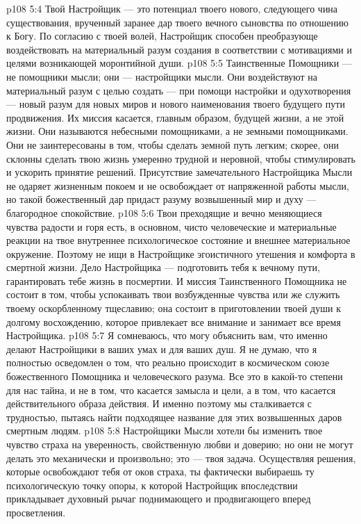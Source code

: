 \vs p108 5:4 \pc Твой Настройщик --- это потенциал твоего нового, следующего чина существования, врученный заранее дар твоего вечного сыновства по отношению к Богу. По согласию с твоей волей, Настройщик способен преобразующе воздействовать на материальный разум создания в соответствии с мотивациями и целями возникающей моронтийной души.
\vs p108 5:5 Таинственные Помощники --- не помощники мысли; они --- настройщики мысли. Они воздействуют на материальный разум с целью создать --- при помощи настройки и одухотворения --- новый разум для новых миров и нового наименования твоего будущего пути продвижения. Их миссия касается, главным образом, будущей жизни, а не этой жизни. Они называются небесными помощниками, а не земными помощниками. Они не заинтересованы в том, чтобы сделать земной путь легким; скорее, они склонны сделать твою жизнь умеренно трудной и неровной, чтобы стимулировать и ускорить принятие решений. Присутствие замечательного Настройщика Мысли не одаряет жизненным покоем и не освобождает от напряженной работы мысли, но такой божественный дар придаст разуму возвышенный мир и духу --- благородное спокойствие.
\vs p108 5:6 Твои преходящие и вечно меняющиеся чувства радости и горя есть, в основном, чисто человеческие и материальные реакции на твое внутреннее психологическое состояние и внешнее материальное окружение. Поэтому не ищи в Настройщике эгоистичного утешения и комфорта в смертной жизни. Дело Настройщика --- подготовить тебя к вечному пути, гарантировать тебе жизнь в посмертии. И миссия Таинственного Помощника не состоит в том, чтобы успокаивать твои возбужденные чувства или же служить твоему оскорбленному тщеславию; она состоит в приготовлении твоей души к долгому восхождению, которое привлекает все внимание и занимает все время Настройщика.
\vs p108 5:7 Я сомневаюсь, что могу объяснить вам, что именно делают Настройщики в ваших умах и для ваших душ. Я не думаю, что я полностью осведомлен о том, что реально происходит в космическом союзе божественного Помощника и человеческого разума. Все это в какой\hyp{}то степени для нас тайна, и не в том, что касается замысла и цели, а в том, что касается действительного образа действия. И именно поэтому мы сталкивается с трудностью, пытаясь найти подходящее название для этих возвышенных даров смертным людям.
\vs p108 5:8 Настройщики Мысли хотели бы изменить твое чувство страха на уверенность, свойственную любви и доверию; но они не могут делать это механически и произвольно; это --- твоя задача. Осуществляя решения, которые освобождают тебя от оков страха, ты фактически выбираешь ту психологическую точку опоры, к которой Настройщик впоследствии прикладывает духовный рычаг поднимающего и продвигающего вперед просветления.
